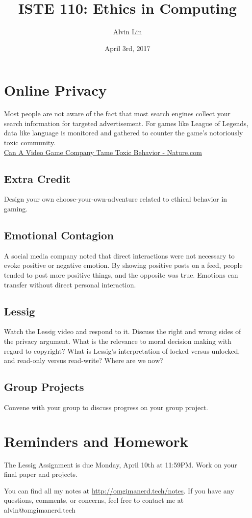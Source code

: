 \documentclass[letterpaper, 12pt]{article}
\title{ISTE 110: Ethics in Computing}
\author{Alvin Lin}
\date{April 3rd, 2017}
\begin{document}
\maketitle

\section*{Online Privacy}
Most people are not aware of the fact that most search engines collect your
search information for targeted advertisement. For games like League of
Legends, data like language is monitored and gathered to counter the game's
notoriously toxic community. \\
\href{http://www.nature.com/news/can-a-video-game-company-tame-toxic-behaviour-1.19647}{Can A Video Game Company Tame Toxic Behavior - Nature.com}

\subsection*{Extra Credit}
Design your own choose-your-own-adventure related to ethical behavior in
gaming.

\subsection*{Emotional Contagion}
A social media company noted that direct interactions were not necessary to
evoke positive or negative emotion. By showing positive posts on a feed,
people tended to post more positive things, and the opposite was true.
Emotions can transfer without direct personal interaction.

\subsection*{Lessig}
Watch the Lessig video and respond to it. Discuss the right and wrong sides
of the privacy argument. What is the relevance to moral decision making with
regard to copyright? What is Lessig's interpretation of locked versus unlocked,
and read-only versus read-write? Where are we now?

\subsection*{Group Projects}
Convene with your group to discuss progress on your group project.

\section*{Reminders and Homework}
The Lessig Assignment is due Monday, April 10th at 11:59PM.
Work on your final paper and projects.

\begin{center}
  You can find all my notes at \url{http://omgimanerd.tech/notes}. If you have
  any questions, comments, or concerns, feel free to contact me at
  alvin@omgimanerd.tech
\end{center}
\end{document}
